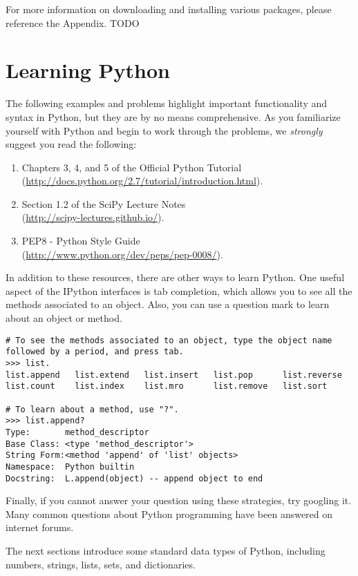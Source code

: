 For more information on downloading and installing various packages, please 
reference the Appendix. TODO


\section*{Learning Python}
The following examples and problems highlight important functionality and syntax in Python, but they are by no means comprehensive.  As you familiarize yourself with Python and begin to work through the problems, we \emph{strongly} suggest you read the following:
\begin{enumerate}
\item Chapters 3, 4, and 5 of the Official Python Tutorial \\
        (\url{http://docs.python.org/2.7/tutorial/introduction.html}).
\item Section 1.2 of the SciPy Lecture Notes \\
        (\url{http://scipy-lectures.github.io/}).
\item PEP8 - Python Style Guide \\
        (\url{http://www.python.org/dev/peps/pep-0008/}).
\end{enumerate}

In addition to these resources, there are other ways to learn Python. One useful aspect of the IPython interfaces is tab completion, which allows you to see all the methods associated to an object. Also, you can use a question mark to learn about an object or method.

\begin{lstlisting}
# To see the methods associated to an object, type the object name followed by a period, and press tab.
>>> list.
list.append   list.extend   list.insert   list.pop      list.reverse  
list.count    list.index    list.mro      list.remove   list.sort

# To learn about a method, use "?".
>>> list.append?
Type:       method_descriptor
Base Class: <type 'method_descriptor'>
String Form:<method 'append' of 'list' objects>
Namespace:  Python builtin
Docstring:  L.append(object) -- append object to end
\end{lstlisting}

Finally, if you cannot answer your question using these strategies, try googling it. Many common questions about Python programming have been answered on internet forums.

The next sections introduce some standard data types of Python, including numbers, strings, lists, sets, and dictionaries. 

